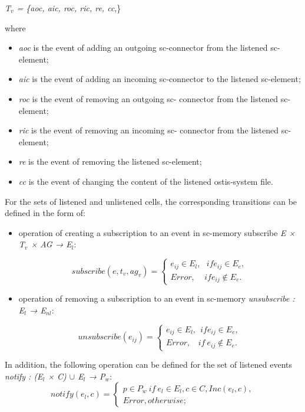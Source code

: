 \documentclass[10pt, a4paper]{article}
\begin{document}
\begin{multicols}{2}
\begin{center}
    \textit{T$_{v}$ = \{aoc, aic, roc, ric, re, cc},\}
\end{center}
where
\begin{itemize}
\setlength{\parskip}{0pt}
\setlength{\itemsep}{0pt}
    \item \textit{aoc} is the event of adding an outgoing sc-connector
from the listened sc-element;
    \item \textit{aic} is the event of adding an incoming sc-connector
to the listened sc-element;
    \item \textit{roc} is the event of removing an outgoing sc-
connector from the listened sc-element;
    \item \textit{ric} is the event of removing an incoming sc-
connector from the listened sc-element;
    \item \textit{re} is the event of removing the listened sc-element;
    \item \textit{cc }is the event of changing the content of the listened
ostis-system file.
\end{itemize}


For the sets of listened and unlistened cells, the corresponding transitions can be defined in the form of:
\begin{itemize}
    \item operation of creating a subscription to an event in sc-memory subscribe  \textit{E × T$_{v}$ × AG → E$_{l}$}:

\begin{equation*}
subscribe(e,t_{v},ag_{v}) =
\begin{cases}
   e_{ij}  \in E_{l},\ \ \ if  e_{ij} \in E_{e}, 
   \\
   Error,\ \ \ \  \  if e_{ij} \notin E_{e}.
 \end{cases}
\end{equation*}
    \item operation of removing a subscription to an event in
sc-memory \textit{unsubscribe : E$_{l}$ → E$_{nl}$}:

\begin{equation*}
unsubscribe(e_{ij}) =
 \begin{cases}
   e_{ij} \in E_{l},  \ \ if e_{ij} \in E_{e}, 
   \\
   Error,\ \ \ \  if \ e _{ij} \notin E_{e}.
 \end{cases}
\end{equation*}
\end{itemize}

In addition, the following operation can be defined for
the set of listened events \textit{notify : (E$_{l}$ × C) $\cup$ E$_{l}$ → P$_{w}$}:
\begin{equation*}
notify(e_{l}, c) = 
 \begin{cases}
   p \in P_{w} \ if \ e_{l} \in E_{l},c \in C,Inc(e_{l},c),
   \\
   Error, otherwise;
 \end{cases}
\end{equation*}


\end{multicols}
\end{document}
